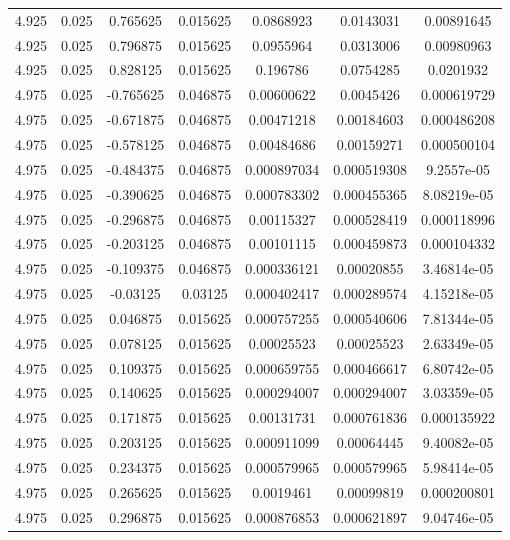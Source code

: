 \begin{table}[bh]
\begin{center}
{\begin{tabular}{ccccccc}
4.925	 & 0.025 & 	0.765625	 & 0.015625	 & 0.0868923	 & 0.0143031	 & 0.00891645 \\ 
4.925	 & 0.025 & 	0.796875	 & 0.015625	 & 0.0955964	 & 0.0313006	 & 0.00980963 \\ 
4.925	 & 0.025 & 	0.828125	 & 0.015625	 & 0.196786	 & 0.0754285	 & 0.0201932 \\ 
4.975	 & 0.025 & 	-0.765625	 & 0.046875	 & 0.00600622	 & 0.0045426	 & 0.000619729 \\ 
4.975	 & 0.025 & 	-0.671875	 & 0.046875	 & 0.00471218	 & 0.00184603	 & 0.000486208 \\ 
4.975	 & 0.025 & 	-0.578125	 & 0.046875	 & 0.00484686	 & 0.00159271	 & 0.000500104 \\ 
4.975	 & 0.025 & 	-0.484375	 & 0.046875	 & 0.000897034	 & 0.000519308	 & 9.2557e-05 \\ 
4.975	 & 0.025 & 	-0.390625	 & 0.046875	 & 0.000783302	 & 0.000455365	 & 8.08219e-05 \\ 
4.975	 & 0.025 & 	-0.296875	 & 0.046875	 & 0.00115327	 & 0.000528419	 & 0.000118996 \\ 
4.975	 & 0.025 & 	-0.203125	 & 0.046875	 & 0.00101115	 & 0.000459873	 & 0.000104332 \\ 
4.975	 & 0.025 & 	-0.109375	 & 0.046875	 & 0.000336121	 & 0.00020855	 & 3.46814e-05 \\ 
4.975	 & 0.025 & 	-0.03125	 & 0.03125	 & 0.000402417	 & 0.000289574	 & 4.15218e-05 \\ 
4.975	 & 0.025 & 	0.046875	 & 0.015625	 & 0.000757255	 & 0.000540606	 & 7.81344e-05 \\ 
4.975	 & 0.025 & 	0.078125	 & 0.015625	 & 0.00025523	 & 0.00025523	 & 2.63349e-05 \\ 
4.975	 & 0.025 & 	0.109375	 & 0.015625	 & 0.000659755	 & 0.000466617	 & 6.80742e-05 \\ 
4.975	 & 0.025 & 	0.140625	 & 0.015625	 & 0.000294007	 & 0.000294007	 & 3.03359e-05 \\ 
4.975	 & 0.025 & 	0.171875	 & 0.015625	 & 0.00131731	 & 0.000761836	 & 0.000135922 \\ 
4.975	 & 0.025 & 	0.203125	 & 0.015625	 & 0.000911099	 & 0.00064445	 & 9.40082e-05 \\ 
4.975	 & 0.025 & 	0.234375	 & 0.015625	 & 0.000579965	 & 0.000579965	 & 5.98414e-05 \\ 
4.975	 & 0.025 & 	0.265625	 & 0.015625	 & 0.0019461	 & 0.00099819	 & 0.000200801 \\ 
4.975	 & 0.025 & 	0.296875	 & 0.015625	 & 0.000876853	 & 0.000621897	 & 9.04746e-05 \\ 

\end{tabular}}
\end{center}
\end{table}
